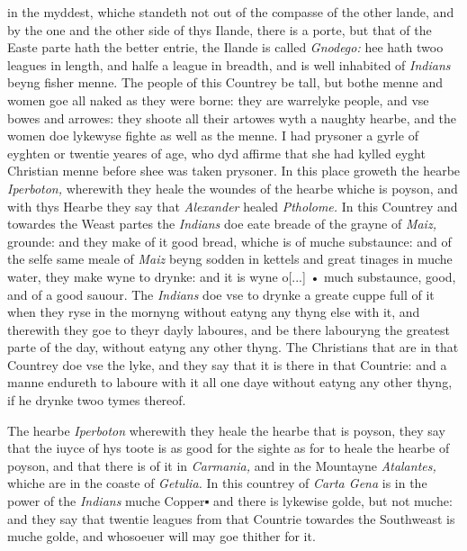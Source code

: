 \documentclass[11pt,twoside]{article}\makeatletter
\def\gap{}
\begin{document}
	\normalmarginpar
       in the myddest, whiche standeth not out of the compasse of the other lande, and by the one and the other side of thys Ilande, there is a porte, but that of the Easte parte hath the better entrie, the Ilande is called {\itshape Gnodego:} hee hath twoo leagues in length, and halfe a league in breadth, and is well inhabited of {\itshape Indians} beyng fisher menne. The peo­ple of this Countrey be tall, but bothe menne and women goe all naked as they were borne: they are warrelyke peo­ple, and vse bowes and arrowes: they shoote all their ar­towes %
 wyth a naughty hearbe, and the women doe lyke­wyse fighte as well as the menne. I had prysoner a gyrle of eyghten or twentie yeares of age, who dyd affirme that she had kylled eyght Christian menne before shee was taken prysoner. In this place groweth the hearbe {\itshape Iperboton,} 
	\normalmarginpar
       wherewith they heale the woundes of the hearbe whiche is poyson, and with thys Hearbe they say that {\itshape Alexander} hea­led {\itshape Ptholome.} In this Countrey and towardes the Weast partes the {\itshape Indians} doe eate breade of the grayne of {\itshape Maiz,} grounde: and they make of it good bread, whiche is of muche substaunce: and of the selfe same meale of {\itshape Maiz} beyng sod­den in kettels and great tinages in muche water, they make wyne to drynke: and it is wyne o[...] {\gap •} much substaunce, good, and of a good sauour. The {\itshape Indians} doe vse to drynke a greate cuppe full of it when they ryse in the mornyng with­out eatyng any thyng else with it, and therewith they goe to theyr dayly laboures, and be there labouryng the grea­test parte of the day, without eatyng any other thyng. The Christians that are in that Countrey doe vse the lyke, and they say that it is there in that Countrie: and a manne endureth to laboure with it all one daye without eatyng any other thyng, if he drynke twoo tymes thereof.\par
The hearbe {\itshape Iperboton} wherewith they heale the hearbe that is poyson, they say that the iuyce of hys toote is as good for the sighte as for to heale the hearbe of poyson, and that there is of it in {\itshape Carmania,} and in the Mountayne {\itshape Ata­lantes,} whiche are in the coaste of {\itshape Getulia.} In this countrey of {\itshape Carta Gena} is in the power of the {\itshape Indians} muche Copper▪ and there is lykewise golde, but not muche: and they say that twentie leagues from that Countrie towardes the South­weast is muche golde, and whosoeuer will may goe thither for it.\par
\end{document}
